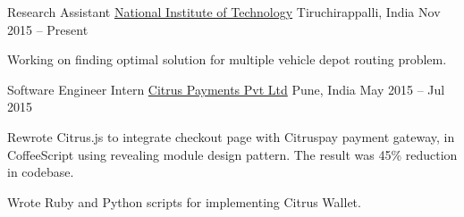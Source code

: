 \begin{cventries}
   \cventry
    {Research Assistant}
    {\href{http://www.nitt.edu/}{National Institute of Technology}}
    {Tiruchirappalli, India}
    {Nov 2015 – Present}
    {
      \begin{cvitems}
        \item {Working on finding optimal solution for multiple vehicle depot routing problem. }
      \end{cvitems}
    }
  \cventry
    {Software Engineer Intern}
    {\href{http://www.citruspay.com/}{Citrus Payments Pvt Ltd}}
    {Pune, India}
    {May 2015 – Jul 2015}
    {
      \begin{cvitems}
        \item {Rewrote Citrus.js to integrate checkout page with Citruspay payment gateway, in CoffeeScript using revealing module design pattern. The result was 45\% reduction in codebase.} 
        \item {Wrote Ruby and Python scripts for implementing Citrus Wallet. }
      \end{cvitems}
    }
    
\end{cventries}
